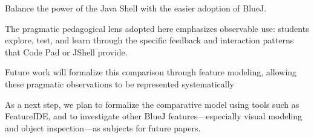\documentclass{article}
\begin{document}
Balance the power of the Java Shell with the easier adoption of BlueJ.

The pragmatic pedagogical lens adopted here emphasizes observable use: students explore, test, and learn through the specific feedback and interaction patterns that Code Pad or JShell provide.

Future work will formalize this comparison through feature modeling, allowing these pragmatic observations to be represented systematically

As a next step, we plan to formalize the comparative model using tools such as FeatureIDE, and to investigate other BlueJ features—especially visual modeling and object inspection—as subjects for future papers.





\end{document}
